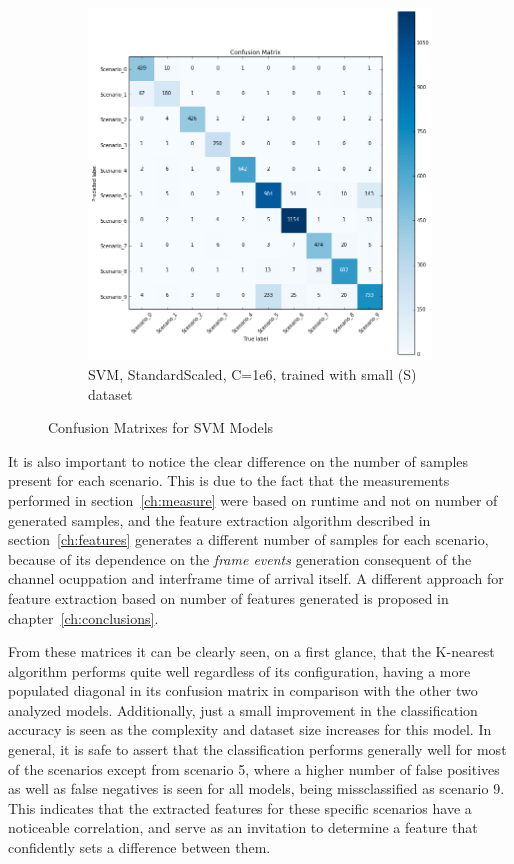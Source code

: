 \begin{figure}[!htb]
\begin{subfigure}[htb]{0.49\textwidth}
        \includegraphics[width=\linewidth]{figures/svc_scaled_S_1e6}
        \caption{\ac{SVM}, StandardScaled, C=1e6, trained with small (S) dataset}
        \label{fig:knn_4}
    \end{subfigure}
    \caption{Confusion Matrixes for \ac{SVM} Models}
    \label{fig:confusionsvc}
\end{figure}
It is also important to notice the clear difference on the number of samples present for each scenario. This is due to the fact that the measurements performed in section~\ref{ch:measure} were based on runtime and not on number of generated samples, and the feature extraction algorithm described in section~\ref{ch:features} generates a different number of samples for each scenario, because of its dependence on the \emph{frame events} generation consequent of the channel ocuppation and interframe time of arrival itself. A different approach for feature extraction based on number of features generated is proposed in chapter~\ref{ch:conclusions}.

From these matrices it can be clearly seen, on a first glance, that the K-nearest algorithm performs quite well regardless of its configuration, having a more populated diagonal in its confusion matrix in comparison with the other two analyzed models. Additionally, just a small improvement in the classification accuracy is seen as the complexity and dataset size increases for this model. In general, it is safe to assert that the classification performs generally well for most of the scenarios except from scenario 5, where a higher number of false positives as well as false negatives is seen for all models, being missclassified as scenario 9. This indicates that the extracted features for these specific scenarios have a noticeable correlation, and serve as an invitation to determine a feature that confidently sets a difference between them.

